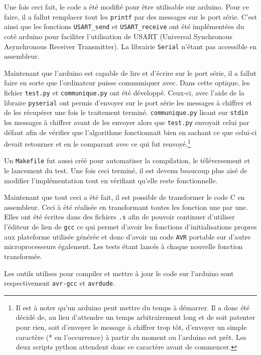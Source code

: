 \documentclass[letterpaper]{article}
\begin{document}
Une fois ceci fait, le code a été modifié pour être utilisable sur arduino.
Pour ce faire, il a fallut remplacer tout les \texttt{printf} par des messages sur le port série.
C'est ainsi que les fonctions \texttt{USART\_send} et \texttt{USART\_receive} ont été implémentées du coté arduino pour faciliter l'utilisation de USART (Universal Synchronous Asynchronous Receiver Transmitter).
La librairie \texttt{Serial} n'étant pas accessible en assembleur.

Maintenant que l'arduino est capable de lire et d'écrire sur le port série, il a fallut faire en sorte que l'ordinateur puisse communiquer avec. Dans cette optique, les fichier \texttt{test.py} et \texttt{communique.py} ont été développé. Ceux-ci, avec l'aide de la libraire \texttt{pyserial} ont permis d'envoyer sur le port série les messages à chiffrer et de les récupérer une fois le traitement terminé. \texttt{communique.py} lisant sur \texttt{stdin} les messages à chiffrer avant de
les envoyer alors que \texttt{test.py} envoyait celui par défaut afin de vérifier que l'algorithme fonctionnait bien en sachant ce que celui-ci devait retourner et en le comparant avec ce qui fut renvoyé.\footnote{Il est à noter qu'un arduino peut mettre du temps à démarrer. Il a donc été décidé de, au lieu d'attendre un temps arbitrairement long et de soit patenter pour rien, soit d'envoyer le message à chiffrer trop tôt, d'envoyer un simple caractère (* en l'occurrence) à partir du
moment ou l'arduino est prêt. Les deux scripts python attendent donc ce caractère avant de commencer.}

Un \texttt{Makefile} fut aussi créé pour automatiser la compilation, le téléversement et le lancement du test. Une fois ceci terminé, il est devenu beaucoup plus aisé de modifier l'implémentation tout en vérifiant qu'elle reste fonctionnelle. 

Maintenant que tout ceci a été fait, il est possible de transformer le code C en assembleur.
Ceci à été réalisée en transformant toutes les fonction une par une.
Elles ont été écrites dans des fichiers \texttt{.s} afin de pouvoir continuer d'utiliser l'éditeur de lien de \texttt{gcc} ce qui permet d'avoir les fonctions d'initialisations propres aux plateforme utilisée générée et donc d'avoir un code \texttt{AVR} portable sur d'autre microprocesseurs également.
Les tests étant lancés à chaque nouvelle fonction transformée.

Les outils utilises pour compiler et mettre à jour le code sur l'arduino sont respectivement \texttt{avr-gcc} et \texttt{avrdude}.
\end{document}
